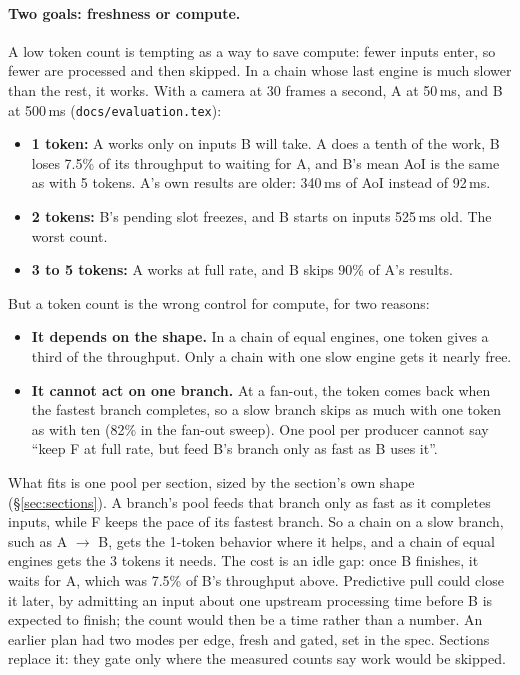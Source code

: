 \documentclass[11pt]{article}
\newcommand{\code}[1]{\texttt{#1}}
\begin{document}
\paragraph{Two goals: freshness or compute.} A low token count is tempting
as a way to save compute: fewer inputs enter, so fewer are processed and
then skipped. In a chain whose last engine is much slower than the rest, it
works. With a camera at 30 frames a second, A at 50\,ms, and B at 500\,ms
(\code{docs/evaluation.tex}):
\begin{itemize}[nosep]
  \item \textbf{1 token:} A works only on inputs B will take. A does a
        tenth of the work, B loses 7.5\% of its throughput to waiting for A,
        and B's mean AoI is the same as with 5 tokens. A's own results are
        older: 340\,ms of AoI instead of 92\,ms.
  \item \textbf{2 tokens:} B's pending slot freezes, and B starts on inputs
        525\,ms old. The worst count.
  \item \textbf{3 to 5 tokens:} A works at full rate, and B skips 90\% of
        A's results.
\end{itemize}
But a token count is the wrong control for compute, for two reasons:
\begin{itemize}[nosep]
  \item \textbf{It depends on the shape.} In a chain of equal engines, one
        token gives a third of the throughput. Only a chain with one slow
        engine gets it nearly free.
  \item \textbf{It cannot act on one branch.} At a fan-out, the token comes
        back when the fastest branch completes, so a slow branch skips as
        much with one token as with ten (82\% in the fan-out sweep). One pool
        per producer cannot say ``keep F at full rate, but feed B's branch
        only as fast as B uses it''.
\end{itemize}
What fits is one pool per section, sized by the section's own shape
(\S\ref{sec:sections}). A branch's pool feeds that branch only as fast as it
completes inputs, while F keeps the pace of its fastest branch. So a chain
on a slow branch, such as A $\to$ B, gets the 1-token behavior where it
helps, and a chain of equal engines gets the 3 tokens it needs. The cost is
an idle gap: once B finishes, it waits for A, which was 7.5\% of B's
throughput above. Predictive pull could close it later, by admitting an
input about one upstream processing time before B is expected to finish;
the count would then be a time rather than a number. An earlier plan had
two modes per edge, fresh and gated, set in the spec. Sections replace it:
they gate only where the measured counts say work would be skipped.
\end{document}

